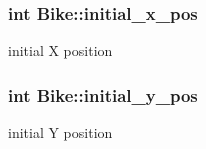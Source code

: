 \subsubsection[{\texorpdfstring{initial\+\_\+x\+\_\+pos}{initial_x_pos}}]{\setlength{\rightskip}{0pt plus 5cm}int Bike\+::initial\+\_\+x\+\_\+pos}\hypertarget{group__Bike_ga01cdf583ace46bc4e576c42b54ee628a}{}\label{group__Bike_ga01cdf583ace46bc4e576c42b54ee628a}
initial X position 
\subsubsection[{\texorpdfstring{initial\+\_\+y\+\_\+pos}{initial_y_pos}}]{\setlength{\rightskip}{0pt plus 5cm}int Bike\+::initial\+\_\+y\+\_\+pos}\hypertarget{group__Bike_ga74f0f95635444a7570225a75f3a22056}{}\label{group__Bike_ga74f0f95635444a7570225a75f3a22056}
initial Y position 